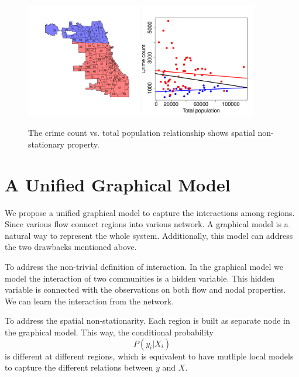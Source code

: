 \begin{figure}[h]
\centering
\includegraphics[width=0.45\textwidth]{fig/north-south-split.pdf}
\includegraphics[width=0.45\textwidth]{fig/crime-pop.pdf}
\caption{The crime count vs. total population relationship shows spatial non-stationary property.}
\label{fig:chi-crime}
\end{figure}



\section{A Unified Graphical Model}

We propose a unified graphical model to capture the interactions among regions. Since various flow connect regions into various network. A graphical model is a natural way to represent the whole system. Additionally, this model can address the two drawbacks mentioned above.

To address the non-trivial definition of interaction. In the graphical model we model the interaction of two communities is a hidden variable. This hidden variable is connected with the observations on both flow and nodal properties. We can learn the interaction from the network.

To address the spatial non-stationarity. Each region is built as separate node in the graphical model. This way, the conditional probability 
\[ P(y_i | X_i) \]
is different at different regions, which is equivalent to have mutliple local models to capture the different relations between $y$ and $X$.





